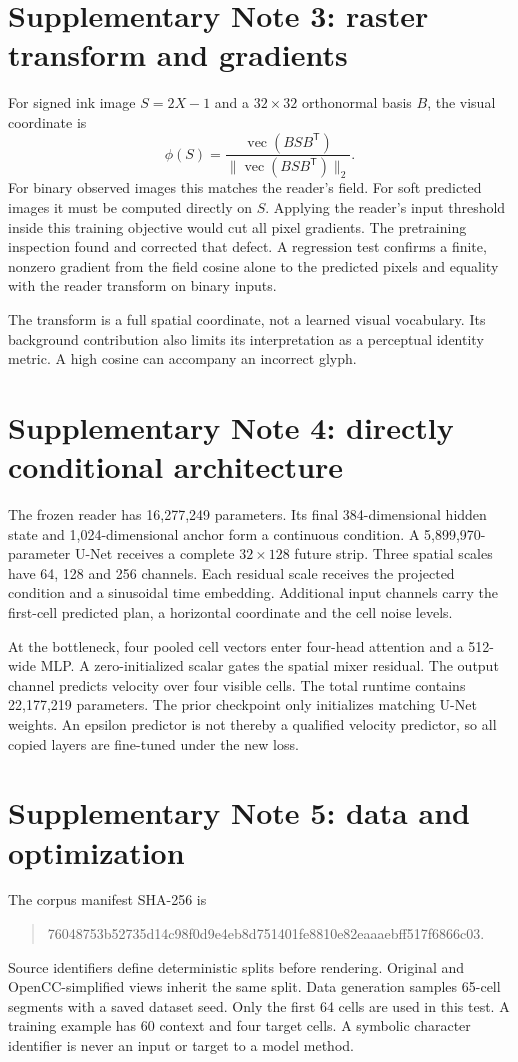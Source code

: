 \documentclass[10pt,a4paper]{article}
\begin{document}
\section*{Supplementary Note 3: raster transform and gradients}
For signed ink image $S=2X-1$ and a $32\times32$ orthonormal basis $B$, the
visual coordinate is
\begin{equation}
\phi(S)=\frac{\operatorname{vec}(BSB^{\mathsf T})}{\|\operatorname{vec}(BSB^{\mathsf T})\|_2}.
\end{equation}
For binary observed images this matches the reader's field. For soft predicted
images it must be computed directly on $S$. Applying the reader's input
threshold inside this training objective would cut all pixel gradients.
The pretraining inspection found and corrected that defect. A regression test
confirms a finite, nonzero gradient from the field cosine alone to the predicted
pixels and equality with the reader transform on binary inputs.

The transform is a full spatial coordinate, not a learned visual vocabulary.
Its background contribution also limits its interpretation as a perceptual
identity metric. A high cosine can accompany an incorrect glyph.

\section*{Supplementary Note 4: directly conditional architecture}
The frozen reader has 16,277,249 parameters. Its final 384-dimensional hidden
state and 1,024-dimensional anchor form a continuous condition. A 5,899,970-
parameter U-Net receives a complete $32\times128$ future strip. Three spatial
scales have 64, 128 and 256 channels. Each residual scale receives the projected
condition and a sinusoidal time embedding. Additional input channels carry the
first-cell predicted plan, a horizontal coordinate and the cell noise levels.

At the bottleneck, four pooled cell vectors enter four-head attention and a
512-wide MLP. A zero-initialized scalar gates the spatial mixer residual.
The output channel predicts velocity over four visible cells. The total
runtime contains 22,177,219 parameters. The prior checkpoint only initializes
matching U-Net weights. An epsilon predictor is not thereby a qualified
velocity predictor, so all copied layers are fine-tuned under the new loss.

\section*{Supplementary Note 5: data and optimization}
The corpus manifest SHA-256 is
\begin{quote}\small\ttfamily
76048753b52735d14c98f0d9e4eb8d751401fe8810e82eaaaebff517f6866c03.
\end{quote}
Source identifiers define deterministic splits before rendering. Original and
OpenCC-simplified views inherit the same split. Data generation samples
65-cell segments with a saved dataset seed. Only the first 64 cells are used
in this test. A training example has 60 context and four target cells. A
symbolic character identifier is never an input or target to a model method.
\end{document}
